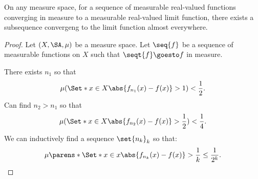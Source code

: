 \begin{prop}
  On any measure space,
  for a sequence
  of measurable real-valued
  functions converging
  in measure to a measurable
  real-valued limit function,
  there exists a subsequence
  convergeng to the limit
  function almost everywhere.

  \begin{proof}
Let $(X, \SA, \mu)$
be a measure space.
Let $\seq{f}$ be a sequence
of measurable functions on $X$
such that $\seqt{f} \goesto f$
in measure.

There exists $n_1$
so that
    \[
      \mu(\Set*{x \in X}{\abs{f_{n_1}(x) - f(x)} > 1}) < \frac{1}{2}.
    \]
    Can find $n_2 > n_1$ so that
    \[
      \mu(\Set*{x \in X}{\abs{f_{n_2}(x) - f(x)} > \frac{1}{2}}) < \frac{1}{4}.
    \]
    We can inductively find
    a sequence
    $\set{n_k}_k$
    so that:
    \[
      \mu\parens*{\Set*{
        x \in x
      }{
        \abs{f_{n_k}(x) - f(x)} > \frac{1}{k}
      }} \leq \frac{1}{2^k}.
    \]
  \end{proof}
\end{prop}
